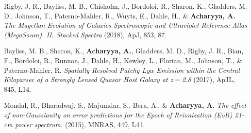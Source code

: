 \documentclass[10pt]{article}
\def\apj{ApJ}
\def\apjl{ApJL}
\def\mnras{MNRAS}
\begin{document}
\begin{etaremune}
    \item Rigby, J. R., Bayliss, M. B., Chisholm, J., Bordoloi, R., Sharon, K., Gladders, M. D., Johnson, T., Paterno-Mahler, R., Wuyts, E., Dahle, H., \& \textbf{Acharyya, A.} \textit{The Magellan Evolution of Galaxies Spectroscopic and Ultraviolet Reference Atlas (MegaSaura). II. Stacked Spectra} (2018), \apj, 853, 87.
    \item Bayliss, M. B., Sharon, K., \textbf{Acharyya, A.}, Gladders, M. D., Rigby, J. R., Bian, F., Bordoloi, R., Runnoe, J., Dahle, H., Kewley, L., Florian, M., Johnson, T., \& Paterno-Mahler, R. \textit{Spatially Resolved Patchy Ly$\alpha$ Emission within the Central Kiloparsec of a Strongly Lensed Quasar Host Galaxy at z$=$2.8} (2017), \apjl, 845, L14.
    \item Mondal, R., Bharadwaj, S., Majumdar, S., Bera, A., \& \textbf{Acharyya, A.} \textit{The effect of non-Gaussianity on error predictions for the Epoch of Reionization (EoR) 21-cm power spectrum.} (2015), \mnras, 449, L41.
\end{etaremune}
\end{document}
